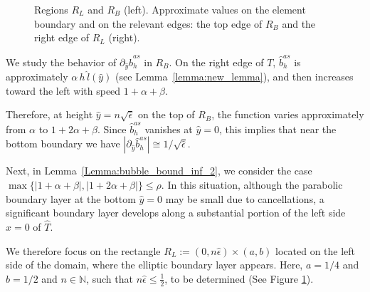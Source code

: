 \documentclass{article}
\newcommand{\N}{\ensuremath{\mathbb{N}}\xspace}
\newcommand{\oab}{\ensuremath{1+\alpha+\beta}}
\newcommand{\otab}{\ensuremath{1+2\alpha+\beta}}
\newcommand{\hatT}{\ensuremath{{\hat{T}}}}
\newcommand{\hatb}{\ensuremath{\hat{b}}}
\newcommand{\hatx}{\ensuremath{{\hat{x}}}}
\newcommand{\haty}{\ensuremath{{\hat{y}}}}
\newcommand{\hatnsep}{\ensuremath{n\sqrt{\hat{\epsilon}}}}
\newcommand{\hatnep}{\ensuremath{n\hat{\epsilon}}}
\begin{document}
\begin{appendix}
\begin{figure}[h]
    \caption{\small\label{F:R_BR_L}  Regions $R_L$ and $R_B$ (left). Approximate values on the element boundary and on the relevant edges: the top edge of $R_B$ and the right edge of $R_L$ (right).}
\end{figure}

We study the behavior of $\partial_\haty \hatb_h^{as}$ in $R_B$. 
On the right edge of $T$, $\hatb_h^{as}$ is approximately $\alpha\,h\,\hat l(\haty)$ (see Lemma~\ref{lemma:new_lemma}), and then increases toward the left with speed $\oab$. 

Therefore, at height $\haty=\hatnsep$ on the top of $R_B$, the function varies approximately from $\alpha$ to $\otab$. Since $\hatb_h^{as}$ vanishes at $\haty=0$, this implies that near the bottom boundary we have $|\partial_\haty \hatb_h^{as}|\cong1/\sqrt{\hat{\epsilon}}$.

Next, in Lemma~\ref{Lemma:bubble_bound_inf_2}, we consider the case
$\max\{|\oab|,|\otab|\}\le \rho$.
In this situation, although the parabolic boundary layer at the bottom ${\haty=0}$ may be small due to cancellations, a significant boundary layer develops along a substantial portion of the left side ${\hatx=0}$ of $\hatT$.

We therefore focus on the rectangle $R_L := (0,n\hat{\epsilon})\times(a,b)$ located on the left side of the domain, where the elliptic boundary layer appears. Here, $a=1/4$ and $b=1/2$ and $n\in\N$, such that $\hatnep \le \frac12$, to be determined (See Figure \ref{F:R_BR_L}).


\end{appendix}
\end{document}
